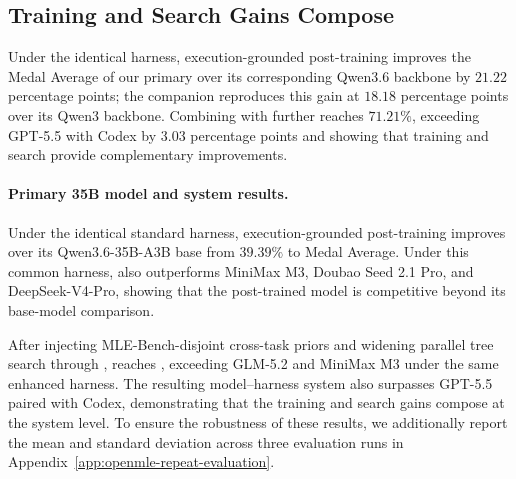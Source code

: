 \subsection{Training and Search Gains Compose}
\label{sec:main-results-lite}


\begin{takeaway}
Under the identical \openmleevo{} harness, execution-grounded post-training
improves the Medal Average of our primary \thirtyfivebmodel{} over its
corresponding Qwen3.6 backbone by $21.22$ percentage points; the companion
\thirtybmodel{} reproduces this gain at $18.18$ percentage points over its
Qwen3 backbone. Combining \thirtyfivebmodel{} with \openmleevomax{} further
reaches $71.21\%$, exceeding GPT-5.5 with Codex by $3.03$ percentage points
and showing that training and search provide complementary improvements.
\end{takeaway}



\paragraph{Primary 35B model and system results.}
Under the identical standard \openmleevo{} harness, execution-grounded post-training improves \thirtyfivebmodel{} over its Qwen3.6-35B-A3B base from $39.39\%$ to \frontisThirtyFiveEvoResult{} Medal Average.
Under this common harness, \thirtyfivebmodel{} also outperforms MiniMax M3, Doubao Seed 2.1 Pro, and DeepSeek-V4-Pro, showing that the post-trained model is competitive beyond its base-model comparison.


After injecting MLE-Bench-disjoint cross-task priors and widening parallel tree search through \openmleevomax{}, \thirtyfivebmodel{} reaches \frontisThirtyFiveEvoMaxResult{}, exceeding GLM-5.2 and MiniMax M3 under the same enhanced harness.
The resulting model--harness system also surpasses GPT-5.5 paired with Codex, demonstrating that the training and search gains compose at the system level. To ensure the robustness of these results, we additionally report the mean and standard deviation across three evaluation runs in Appendix~\ref{app:openmle-repeat-evaluation}.

